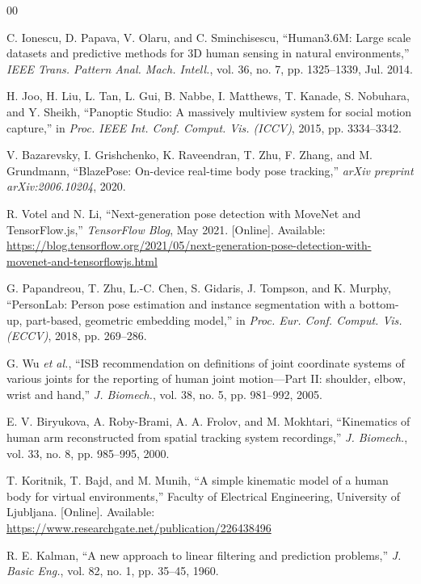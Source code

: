 \documentclass[conference]{IEEEtran}
\begin{document}
\begin{thebibliography}{00}

C. Ionescu, D. Papava, V. Olaru, and C. Sminchisescu, ``Human3.6M: Large
scale datasets and predictive methods for 3D human sensing in natural
environments,'' \textit{IEEE Trans. Pattern Anal. Mach. Intell.}, vol.
36, no. 7, pp. 1325--1339, Jul. 2014.

H. Joo, H. Liu, L. Tan, L. Gui, B. Nabbe, I. Matthews, T. Kanade, S.
Nobuhara, and Y. Sheikh, ``Panoptic Studio: A massively multiview system
for social motion capture,'' in \textit{Proc. IEEE Int. Conf. Comput.
Vis. (ICCV)}, 2015, pp. 3334--3342.

V. Bazarevsky, I. Grishchenko, K. Raveendran, T. Zhu, F. Zhang, and M.
Grundmann, ``BlazePose: On-device real-time body pose tracking,''
\textit{arXiv preprint arXiv:2006.10204}, 2020.

R. Votel and N. Li, ``Next-generation pose detection with MoveNet and
TensorFlow.js,'' \textit{TensorFlow Blog}, May 2021. [Online]. Available:
\url{https://blog.tensorflow.org/2021/05/next-generation-pose-detection-with-movenet-and-tensorflowjs.html}

G. Papandreou, T. Zhu, L.-C. Chen, S. Gidaris, J. Tompson, and K. Murphy,
``PersonLab: Person pose estimation and instance segmentation with a
bottom-up, part-based, geometric embedding model,'' in \textit{Proc. Eur.
Conf. Comput. Vis. (ECCV)}, 2018, pp. 269--286.

G. Wu \textit{et al.}, ``ISB recommendation on definitions of joint
coordinate systems of various joints for the reporting of human joint
motion---Part II: shoulder, elbow, wrist and hand,'' \textit{J. Biomech.},
vol. 38, no. 5, pp. 981--992, 2005.

E. V. Biryukova, A. Roby-Brami, A. A. Frolov, and M. Mokhtari,
``Kinematics of human arm reconstructed from spatial tracking system
recordings,'' \textit{J. Biomech.}, vol. 33, no. 8, pp. 985--995, 2000.

T. Koritnik, T. Bajd, and M. Munih, ``A simple kinematic model of a human
body for virtual environments,'' Faculty of Electrical Engineering,
University of Ljubljana. [Online]. Available:
\url{https://www.researchgate.net/publication/226438496}

R. E. Kalman, ``A new approach to linear filtering and prediction
problems,'' \textit{J. Basic Eng.}, vol. 82, no. 1, pp. 35--45, 1960.


\end{thebibliography}
\end{document}
